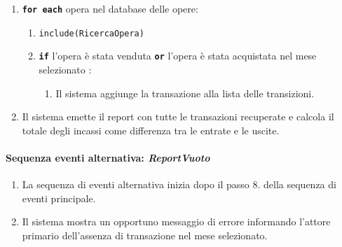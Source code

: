 \documentclass{article}
\begin{document}
\begin{enumerate}[itemsep=8pt,parsep=0pt]
		\item \texttt{\textbf{for each}} opera nel database delle opere:
		    \begin{enumerate}	[leftmargin=28pt]
				\item \texttt{{include(RicercaOpera)}}
				\item \texttt{\textbf{if}} l'opera è stata venduta \texttt{\textbf{or}} l'opera è stata acquistata nel mese selezionato :
					\begin{enumerate}	[leftmargin=28pt]
						\item Il sistema aggiunge la transazione alla lista delle transizioni.
		  			\end{enumerate}	
  		    \end{enumerate}

		\item Il sistema emette il report con tutte le transazioni recuperate e calcola il totale degli incassi come differenza tra le entrate e le uscite.

	\end{enumerate}
	
		\paragraph{Sequenza eventi alternativa: \textit{ReportVuoto}}
	\begin{enumerate}	[leftmargin=28pt]
			\item  La sequenza di eventi alternativa inizia dopo il passo 8. della sequenza di eventi principale.
			\item  Il sistema mostra un opportuno messaggio di errore informando l'attore primario dell'assenza di transazione nel mese selezionato.
		\end{enumerate}
	
	
	
\end{document}
